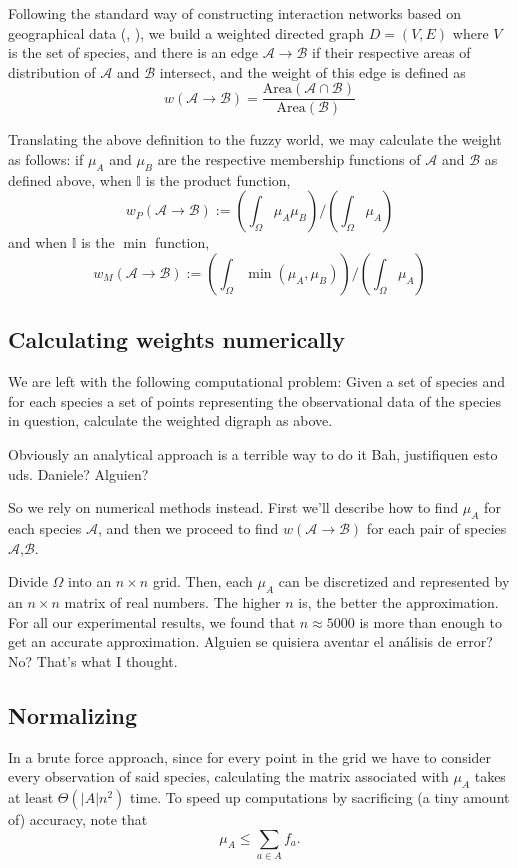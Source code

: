 \documentclass[12pt]{article}
\numberwithin{equation}{section} %
\numberwithin{figure}{section} %
\def\area{{\text{Area}}} %
\def\cA{{\mathcal{A}}}
\def\cB{{\mathcal{B}}}
\def\II{{\mathbb{I}}}
\theoremstyle{definition}
\def\tcb#1{\textcolor{MyBlue}{#1}}
\def\tcr#1{\textcolor{MyRed}{#1}}
\begin{document}
	Following the standard way of constructing interaction networks based on geographical data (\cite{cesarthesis}, \cite{cesarpaper1}), we build a weighted directed graph $D=(V,E)$ where $V$ is the set of species, and there is an edge $\cA \to \cB$ if their respective areas of distribution of $\cA$ and $\cB$ intersect, and the weight of this edge is defined as
	$$w(\cA \to \cB) = \frac{\area(\cA\cap\cB)}{\area(\cB)}$$

	Translating the above definition to the fuzzy world, we may calculate the weight as follows: if $\mu_A$ and $\mu_B$ are the respective membership functions of $\cA$ and $\cB$ as defined above, when $\II$ is the product function,
	$$w_P(\cA \to \cB) := \left(\int_\Omega \mu_A\mu_B\right)\big/\left(\int_\Omega \mu_A\right) $$
	and when $\II$ is the $\min$ function,
	$$w_M(\cA \to \cB) := \left(\int_\Omega \min(\mu_A,\mu_B)\right)\big/\left(\int_\Omega \mu_A\right) $$
	
\subsection{Calculating weights numerically}

We are left with the following computational problem: Given a set of species and for each species a set of points representing the observational data of the species in question, calculate the weighted digraph as above.

Obviously an analytical approach is a terrible way to do it \tcr{Bah, justifiquen esto uds. Daniele? Alguien?}

So we rely on numerical methods instead. First we'll describe how to find $\mu_A$ for each species $\cA$, and then we proceed to find $w(\cA\to\cB)$ for each pair of species $\cA$,$\cB$.

Divide $\Omega$ into an $n\times n$ grid. Then, each $\mu_A$ can be discretized and represented by an $n\times n$ matrix of real numbers. The higher $n$ is, the better the approximation. For all our experimental results, we found that $n \approx 5000$ is more than enough to get an accurate approximation. \tcr{Alguien se quisiera aventar el análisis de error? No? That's what I thought.}


\subsection{Normalizing}

	In a brute force approach, since for every point in the grid we have to consider every observation of said species, calculating the matrix associated with $\mu_A$ takes at least $\Theta(|A|n^2)$ time. To speed up computations by sacrificing \tcb{(a tiny amount of)} accuracy, note that 
		$$\mu_A \leq \sum_{a\in A} f_a.$$
		
\end{document}
